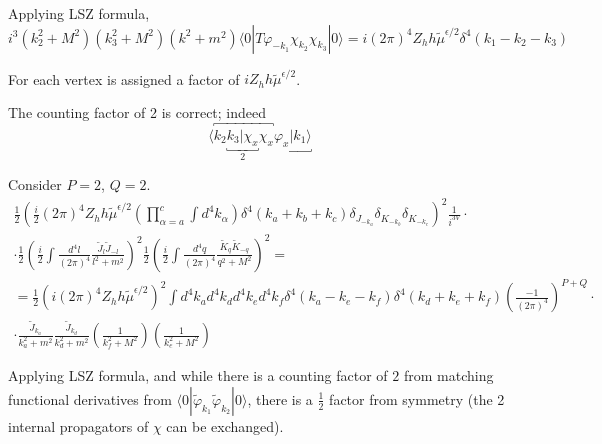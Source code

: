 \documentclass[twoside]{amsart}
\begin{document}
Applying LSZ formula,
\[
i^3(k_2^2 + M^2) (k_3^2+ M^2) ( k^2+m^2) \langle 0 | T\varphi_{-k_1} \chi_{k_2} \chi_{k_3} | 0 \rangle = i (2\pi)^4 Z_h h \widetilde{\mu}^{\epsilon/2} \delta^4(k_1 - k_2 - k_3)
\]


For each vertex is assigned a factor of $iZ_h h \widetilde{\mu}^{\epsilon/2}$.  


The counting factor of 2 is correct; indeed
\[
\langle \overbracket{ k_2 \underbracket{ k_3 | \chi_x}_2 \chi_x } \underbracket{ \varphi_x | k_1 \rangle }
\]

Consider $P = 2$, $Q=2$.  
\[
\begin{gathered}
  \frac{1}{2} \left( \frac{i}{2} (2\pi)^4 Z_h h \widetilde{\mu}^{\epsilon/2} \left( \prod_{\alpha = a}^c \int d^4k_{\alpha} \right) \delta^4(k_a+k_b + k_c) \delta_{J_{-k_a}} \delta_{K_{-k_b}} \delta_{K_{-k_c} } \right)^2 \frac{1}{i^{3V}} \cdot \\ 
  \cdot \frac{1}{2} \left( \frac{i}{2} \int  \frac{ d^4l}{ (2\pi)^4} \frac{ \widetilde{J}_l \widetilde{J}_{-l} }{ l^2 + m^2 } \right)^2 \frac{1}{2}  \left( \frac{i}{2} \int  \frac{ d^4q}{ (2\pi)^4} \frac{ \widetilde{K}_q \widetilde{K}_{-q} }{ q^2 + M^2 } \right)^2 = \\ 
  = \frac{1}{2} ( i (2\pi)^4 Z_h h \widetilde{\mu}^{\epsilon/2} )^2 \int d^4k_a d^4k_d d^4k_e d^4k_f \delta^4(k_a - k_e - k_f) \delta^4(k_d + k_e +k_f) \left( \frac{ -1}{ (2\pi)^4} \right)^{ P+Q} \cdot \\
  \cdot \frac{ \widetilde{J}_{k_a} }{ k_a^2 + m^2} \frac{ \widetilde{J}_{k_d} }{ k_d^2 + m^2} \left( \frac{1}{ k_f^2 + M^2 } \right)  \left( \frac{1}{ k_e^2 + M^2 } \right)  
\end{gathered}
\]

Applying LSZ formula, and while there is a counting factor of $2$ from matching functional derivatives from $\langle 0 | \widetilde{\varphi}_{k_1} \widetilde{\varphi}_{k_2} | 0 \rangle$, there is a $\frac{1}{2}$ factor from symmetry (the 2 internal propagators of $\chi$ can be exchanged).  
\end{document}
